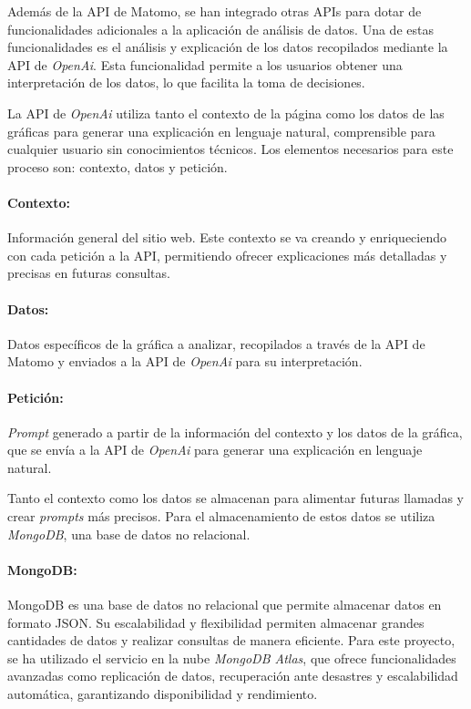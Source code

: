 Además de la API de Matomo, se han integrado otras APIs para dotar de funcionalidades adicionales a la aplicación de análisis de datos. 
Una de estas funcionalidades es el análisis y explicación de los datos recopilados mediante la API de \textit{OpenAi}. Esta funcionalidad 
permite a los usuarios obtener una interpretación de los datos, lo que facilita la toma de decisiones.

La API de \textit{OpenAi} utiliza tanto el contexto de la página como los datos de las gráficas para generar una explicación en lenguaje 
natural, comprensible para cualquier usuario sin conocimientos técnicos. Los elementos necesarios para este proceso son: contexto, datos y petición.

\paragraph{Contexto:} Información general del sitio web. Este contexto se va creando y enriqueciendo con cada petición a la API, 
permitiendo ofrecer explicaciones más detalladas y precisas en futuras consultas.

\paragraph{Datos:} Datos específicos de la gráfica a analizar, recopilados a través de la API de Matomo y enviados a la API de \textit{OpenAi} 
para su interpretación.

\paragraph{Petición:} \textit{Prompt} generado a partir de la información del contexto y los datos de la gráfica, que se envía a la API de \textit{OpenAi} 
para generar una explicación en lenguaje natural.

Tanto el contexto como los datos se almacenan para alimentar futuras llamadas y crear \textit{prompts} más precisos. Para el almacenamiento de estos datos 
se utiliza \textit{MongoDB}, una base de datos no relacional.

\paragraph{MongoDB:} MongoDB es una base de datos no relacional que permite almacenar datos en formato JSON. Su escalabilidad y flexibilidad permiten 
almacenar grandes cantidades de datos y realizar consultas de manera eficiente. Para este proyecto, se ha utilizado el servicio en la nube \textit{MongoDB Atlas}, 
que ofrece funcionalidades avanzadas como replicación de datos, recuperación ante desastres y escalabilidad automática, garantizando disponibilidad y rendimiento.

